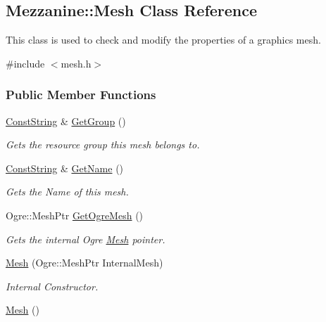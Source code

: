 \hypertarget{classMezzanine_1_1Mesh}{
\subsection{Mezzanine::Mesh Class Reference}
\label{classMezzanine_1_1Mesh}
}


This class is used to check and modify the properties of a graphics mesh.  




{\ttfamily \#include $<$mesh.h$>$}

\subsubsection*{Public Member Functions}
\begin{DoxyCompactItemize}
\item 
\hyperlink{namespaceMezzanine_a63cd699ac54b73953f35ec9cfc05e506}{ConstString} \& \hyperlink{classMezzanine_1_1Mesh_a80cbbce88eed766feee7cdf9f71d1039}{GetGroup} ()
\begin{DoxyCompactList}\small\item\em Gets the resource group this mesh belongs to. \item\end{DoxyCompactList}\item 
\hyperlink{namespaceMezzanine_a63cd699ac54b73953f35ec9cfc05e506}{ConstString} \& \hyperlink{classMezzanine_1_1Mesh_a47c1bc6949e55f122b4bef9d8b99ca6d}{GetName} ()
\begin{DoxyCompactList}\small\item\em Gets the Name of this mesh. \item\end{DoxyCompactList}\item 
Ogre::MeshPtr \hyperlink{classMezzanine_1_1Mesh_aee175d130655986fb4a4b2a3b92ec4bf}{GetOgreMesh} ()
\begin{DoxyCompactList}\small\item\em Gets the internal Ogre \hyperlink{classMezzanine_1_1Mesh}{Mesh} pointer. \item\end{DoxyCompactList}\item 
\hyperlink{classMezzanine_1_1Mesh_a7f93137e60133fa0d35e83946adb5962}{Mesh} (Ogre::MeshPtr InternalMesh)
\begin{DoxyCompactList}\small\item\em Internal Constructor. \item\end{DoxyCompactList}\item 
\hypertarget{classMezzanine_1_1Mesh_ae27e49d18855b085a4b723b91026ec9b}{
\hyperlink{classMezzanine_1_1Mesh_ae27e49d18855b085a4b723b91026ec9b}{Mesh} ()}
\label{classMezzanine_1_1Mesh_ae27e49d18855b085a4b723b91026ec9b}


\end{DoxyCompactItemize}
